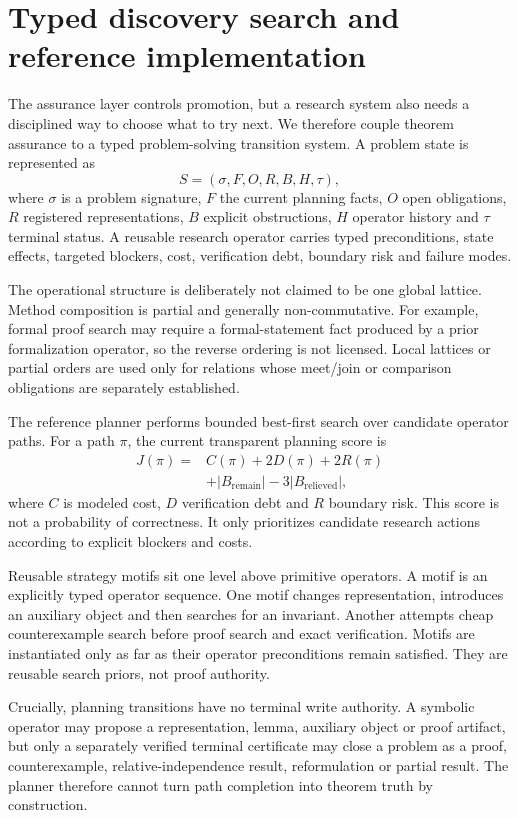 \documentclass[11pt]{article}
\begin{document}
\section{Typed discovery search and reference implementation}

The assurance layer controls promotion, but a research system also needs a disciplined way to choose what to try next. We therefore couple theorem assurance to a typed problem-solving transition system. A problem state is represented as
\[
S=(\sigma,F,O,R,B,H,\tau),
\]
where $\sigma$ is a problem signature, $F$ the current planning facts, $O$ open obligations, $R$ registered representations, $B$ explicit obstructions, $H$ operator history and $\tau$ terminal status. A reusable research operator carries typed preconditions, state effects, targeted blockers, cost, verification debt, boundary risk and failure modes.

The operational structure is deliberately not claimed to be one global lattice. Method composition is partial and generally non-commutative. For example, formal proof search may require a formal-statement fact produced by a prior formalization operator, so the reverse ordering is not licensed. Local lattices or partial orders are used only for relations whose meet/join or comparison obligations are separately established.

The reference planner performs bounded best-first search over candidate operator paths. For a path $\pi$, the current transparent planning score is
\[
\begin{aligned}
J(\pi)={}&C(\pi)+2D(\pi)+2R(\pi)\\
&+|B_{\mathrm{remain}}|-3|B_{\mathrm{relieved}}|,
\end{aligned}
\]
where $C$ is modeled cost, $D$ verification debt and $R$ boundary risk. This score is not a probability of correctness. It only prioritizes candidate research actions according to explicit blockers and costs.

Reusable strategy motifs sit one level above primitive operators. A motif is an explicitly typed operator sequence. One motif changes representation, introduces an auxiliary object and then searches for an invariant. Another attempts cheap counterexample search before proof search and exact verification. Motifs are instantiated only as far as their operator preconditions remain satisfied. They are reusable search priors, not proof authority.

Crucially, planning transitions have no terminal write authority. A symbolic operator may propose a representation, lemma, auxiliary object or proof artifact, but only a separately verified terminal certificate may close a problem as a proof, counterexample, relative-independence result, reformulation or partial result. The planner therefore cannot turn path completion into theorem truth by construction.
\end{document}
